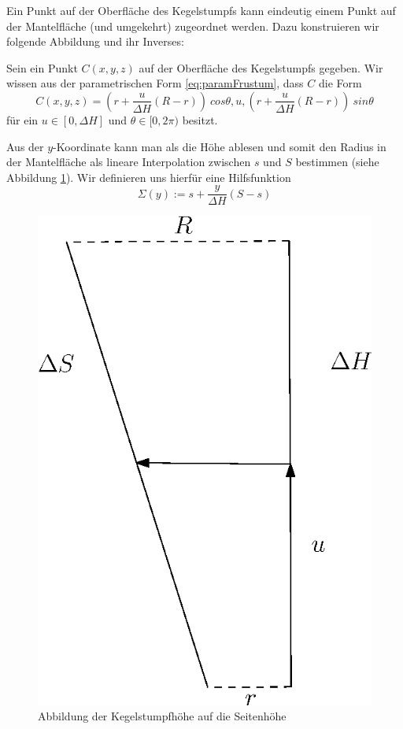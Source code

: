Ein Punkt auf der Oberfläche des Kegelstumpfs kann eindeutig einem Punkt auf der Mantelfläche (und umgekehrt) zugeordnet werden. Dazu konstruieren wir folgende Abbildung und ihr Inverses:

Sein ein Punkt $C(x,y,z)$ auf der Oberfläche des Kegelstumpfs gegeben. Wir wissen aus der parametrischen Form \ref{eq:paramFrustum}, dass $C$ die Form
\[
C(x,y,z) = (r + \frac{u}{\Delta H} (R - r))~cos \theta, u, (r + \frac{u}{\Delta H} (R - r))~sin \theta
\]  für ein $u\in [0, \Delta H]$ und $\theta \in [0, 2\pi)$ besitzt. 

Aus der $y$-Koordinate kann man als die Höhe ablesen und somit den Radius in der Mantelfläche als lineare Interpolation zwischen $s$ und $S$ bestimmen (siehe Abbildung \ref{fig:mapToLateralS}). Wir definieren uns hierfür eine Hilfsfunktion 
\begin{equation} \label{eq:Sigma}
	\Sigma(y) := s + \frac{y}{\Delta H} (S-s)
\end{equation}


\begin{figure}[!htb]
	\centering
	\includegraphics[scale=.7]{images/mapToLateralS.eps}
	\caption{Abbildung der Kegelstumpfhöhe auf die Seitenhöhe}
	\label{fig:mapToLateralS}
\end{figure}

